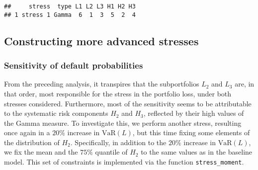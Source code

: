 \documentclass[
]{article}
\begin{document}
\begin{verbatim}
##     stress  type L1 L2 L3 H1 H2 H3
## 1 stress 1 Gamma  6  1  3  5  2  4
\end{verbatim}

\hypertarget{constructing-more-advanced-stresses}{%
\subsection{Constructing more advanced stresses}\label{constructing-more-advanced-stresses}}

\hypertarget{sensitivity-of-default-probabilities}{%
\subsubsection{Sensitivity of default probabilities}\label{sensitivity-of-default-probabilities}}

From the preceding analysis, it transpires that the subportfolios \(L_2\) and \(L_3\) are, in that order, most responsible for the stress in the portfolio loss, under both stresses considered. Furthermore, most of the sensitivity seems to be attributable to the systematic risk components \(H_2\) and \(H_3\), reflected by their high values of the Gamma measure. To investigate this, we perform another stress, resulting once again in a \(20\%\) increase in \(\text{VaR}(L)\), but this time fixing some elements of the distribution of \(H_2\). Specifically, in addition to the \(20\%\) increase in \(\text{VaR}(L)\), we fix the mean and the \(75\%\) quantile of \(H_2\) to the same values as in the baseline model. This set of constraints is implemented via the function \texttt{stress\_moment}.
\end{document}

